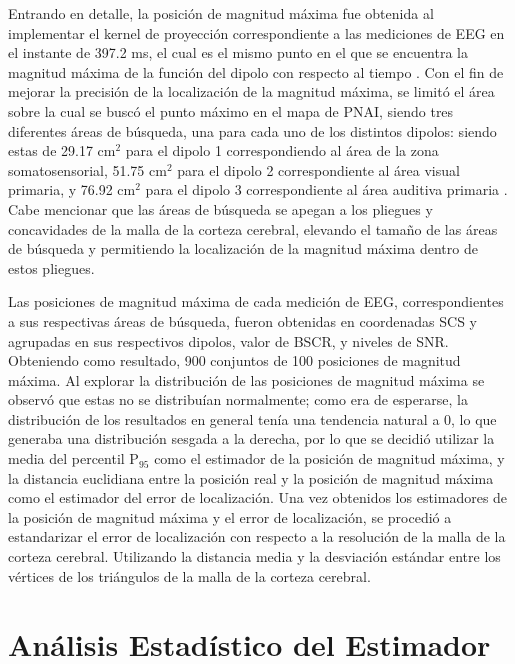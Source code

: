 Entrando en detalle, la posición de magnitud máxima fue obtenida al implementar el kernel de proyección correspondiente a las mediciones de EEG en el instante de 397.2 ms, el cual es el mismo punto en el que se encuentra la magnitud máxima de la función del dipolo con respecto al tiempo . Con el fin de mejorar la precisión de la localización de la magnitud máxima, se limitó el área sobre la cual se buscó el punto máximo en el mapa de PNAI, siendo tres diferentes áreas de búsqueda, una para cada uno de los distintos dipolos: siendo estas de 29.17 cm$^2$ para el dipolo 1 correspondiendo al área de la zona somatosensorial, 51.75 cm$^2$ para el dipolo 2 correspondiente al área visual primaria, y 76.92 cm$^2$ para el dipolo 3 correspondiente al área auditiva primaria . Cabe mencionar que las áreas de búsqueda se apegan a los pliegues y concavidades de la malla de la corteza cerebral, elevando el tamaño de las áreas de búsqueda y permitiendo la localización de la magnitud máxima dentro de estos pliegues.

Las posiciones de magnitud máxima de cada medición de EEG, correspondientes a sus respectivas áreas de búsqueda, fueron obtenidas en coordenadas SCS y agrupadas en sus respectivos dipolos, valor de BSCR, y niveles de SNR. Obteniendo como resultado, 900 conjuntos de 100 posiciones de magnitud máxima. Al explorar la distribución de las posiciones de magnitud máxima se observó que estas no se distribuían normalmente; como era de esperarse, la distribución de los resultados en general tenía una tendencia natural a 0, lo que generaba una distribución sesgada a la derecha, por lo que se decidió utilizar la media del percentil P$_{95}$ como el estimador de la posición de magnitud máxima, y la distancia euclidiana entre la posición real y la posición de magnitud máxima como el estimador del error de localización. Una vez obtenidos los estimadores de la posición de magnitud máxima y el error de localización, se procedió a estandarizar el error de localización con respecto a la resolución de la malla de la corteza cerebral. Utilizando la distancia media y la desviación estándar entre los vértices de los triángulos de la malla de la corteza cerebral.

\section{Análisis Estadístico del Estimador}
\label{sec:methodology:statistical}

